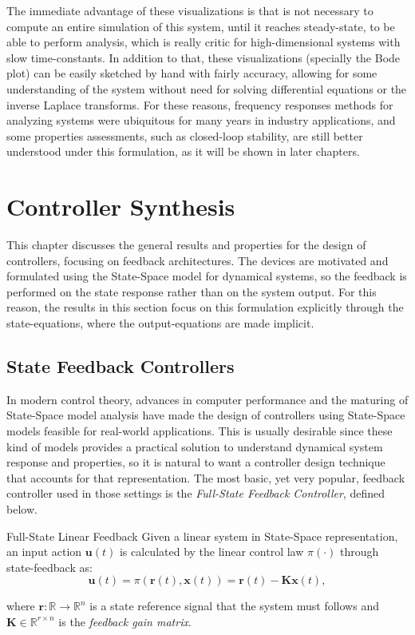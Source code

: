 \documentclass[a4paper,11pt]{book}
\numberwithin{figure}{chapter}
\numberwithin{equation}{chapter}
\numberwithin{table}{chapter}
\theoremstyle{definition}
\newtheorem{definition}{Definition}[chapter]
\newcounter{boxed-theorem}
\newcounter{boxed-lemma}
\newcounter{boxed-definition}
\newenvironment{boxed-definition}[1]
{\colorlet{shadecolor}{pastelYellow!15} \begin{shaded} \begin{definition}{#1}}
{\end{definition} \end{shaded}}
\newcounter{boxed-example}
\begin{document}
The immediate advantage of these visualizations is that is not necessary to compute an entire simulation of this system, until it reaches steady-state, to be able to perform analysis, which is really critic for high-dimensional systems with slow time-constants. In addition to that, these visualizations (specially the Bode plot) can be easily sketched by hand with fairly accuracy, allowing for some understanding of the system without need for solving differential equations or the inverse Laplace transforms. For these reasons, frequency responses methods for analyzing systems were ubiquitous for many years in industry applications, and some properties assessments, such as closed-loop stability, are still better understood under this formulation, as it will be shown in later chapters.

\clearpage
\chapter{Controller Synthesis}

This chapter discusses the general results and properties for the design of controllers, focusing on feedback architectures. The devices are motivated and formulated using the State-Space model for dynamical systems, so the feedback is performed on the state response rather than on the system output. For this reason, the results in this section focus on this formulation explicitly through the state-equations, where the output-equations are made implicit.

\section{State Feedback Controllers}

In modern control theory, advances in computer performance and the maturing of State-Space model analysis have made the design of controllers using State-Space models feasible for real-world applications. This is usually desirable since these kind of models provides a practical solution to understand dynamical system response and properties, so it is natural to want a controller design technique that accounts for that representation. The most basic, yet very popular, feedback controller used in those settings is the \textit{Full-State Feedback Controller}, defined below. 

\begin{boxed-definition}{Full-State Linear Feedback}
    Given a linear system in State-Space representation, an input action $\bm{u}(t)$ is calculated by the linear control law $\pi(\cdot)$ through state-feedback as:
    \begin{equation}
        \bm{u}(t) = \pi(\bm{r}(t), \bm{x}(t)) = \bm{r}(t) - \bm{K} \bm{x}(t)
    ,\end{equation}
    
    \noindent where $\bm{r} : \mathbb{R} \rightarrow \mathbb{R}^{n}$ is a state reference signal that the system must follows and $\bm{K} \in \mathbb{R}^{r \times n}$ is the \textit{feedback gain matrix}.
\end{boxed-definition}
\end{document}
